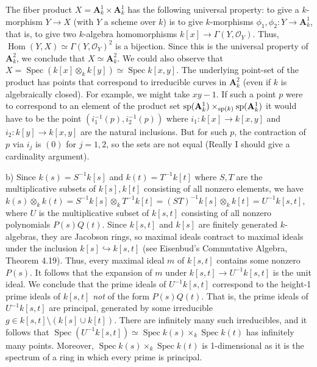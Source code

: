 \documentclass{report}
\renewcommand{\O}{\mathcal{O}}
\newcommand{\A}{\mathbf{A}}
\DeclareMathOperator{\Hom}{Hom}
\DeclareMathOperator{\Spec}{Spec}
\begin{document}
\bigskip
{}	The fiber product $X=\A_k^1\times \A_k^1$ has the following universal property: to give a $k$-morphism $Y\rightarrow X$
(with $Y$ a scheme over $k$)
is to give $k$-morphisms $\phi_1,\phi_2:Y\rightarrow \A_k^1$, that is, to give two $k$-algebra homomorphisms $k[x]\rightarrow \Gamma(Y,\O_Y)$.
Thus, $\Hom(Y,X)\simeq \Gamma(Y,\O_Y)^2$ is a bijection.  Since this is the universal property of $\A_k^2$, we conclude
that $X\simeq \A_k^2$.  We could also observe that $X=\Spec (k[x]\otimes_k k[y])\simeq \Spec k[x,y]$.	
The underlying point-set of the product has points that correspond to irreducible curves in $\A_k^2$ (even if $k$ is
algebraically closed).  For example, we might take $xy-1$.  If such a point $p$ were to correspond to an element of the product
set ${\rm sp}(\A_k^1)\times_{{\rm sp}(k)}{\rm sp}(\A_k^1)$ it would have to be the point $(i_1^{-1}(p),i_2^{-1}(p))$
where $i_1:k[x]\rightarrow k[x,y]$ and $i_2:k[y]\rightarrow k[x,y]$ are the natural inclusions.  But for such $p$,
the contraction of $p$ via $i_j$ is $(0)$ for $j=1,2$, so the sets are not equal (Really I should give a cardinality argument).  

b) Since $k(s)=S^{-1}k[s]$ and $k(t)=T^{-1}k[t]$ where $S,T$ are the multiplicative subsets of $k[s],k[t]$
consisting of all nonzero elements, we have $k(s)\otimes_k k(t)=S^{-1}k[s]\otimes_k T^{-1}k[t]=(ST)^{-1} k[s]\otimes_k k[t]=U^{-1}k[s,t]$,
where $U$ is the multiplicative subset of $k[s,t]$ consisting of all nonzero polynomials $P(s)Q(t)$.
Since $k[s,t]$ and $k[s]$ are finitely generated $k$-algebras, they are Jacobson rings, so maximal ideals contract
to maximal ideals under the inclusion $k[s]\hookrightarrow k[s,t]$ (see Eisenbud's Commutative Algebra, Theorem 4.19).
Thus, every maximal ideal $m$ of $k[s,t]$ contains some nonzero $P(s)$.  It follows that the expansion of $m$ under $k[s,t]\rightarrow U^{-1}k[s,t]$
is the unit ideal.  We conclude that the prime ideals of $U^{-1}k[s,t]$ correspond to the height-1 prime ideals of $k[s,t]$ {\em not}
of the form $P(s)Q(t)$.  That is, the prime ideals of $U^{-1}k[s,t]$ are principal, generated by some irreducible $g\in k[s,t]\setminus (k[s]\cup k[t])$.
There are infinitely many such irreducibles, and it follows that $\Spec (U^{-1}k[s,t])\simeq \Spec k(s)\times_k \Spec k(t)$
has infinitely many points.  Moreover, $\Spec k(s)\times_k \Spec k(t)$ is 1-dimensional as it is the spectrum of a ring in which
every prime is principal. 
\end{document}
